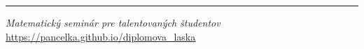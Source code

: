 
\vfill
\noindent\rule{\textwidth}{1pt}
\textit{Matematický seminár pre talentovaných študentov}\\
\url{https://pancelka.github.io/diplomova_laska}

